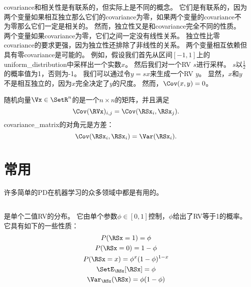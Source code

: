 \gls{covariance}和相关性是有联系的，但实际上是不同的概念。
它们是有联系的，因为两个变量如果相互独立那么它们的\gls{covariance}为零，如果两个变量的\gls{covariance}不为零那么它们一定是相关的。
然而，独立性又是和\gls{covariance}完全不同的性质。
两个变量如果\gls{covariance}为零，它们之间一定没有线性关系。
独立性比零\gls{covariance}的要求更强，因为独立性还排除了非线性的关系。
两个变量相互依赖但具有零\gls{covariance}是可能的。
例如，假设我们首先从区间$[-1, 1]$上的\gls{uniform_distribution}中采样出一个实数$x$。
然后我们对一个\gls{RV} $s$进行采样。
$s$以$\frac{1}{2}$的概率值为1，否则为-1。
我们可以通过令$y=sx$来生成一个\gls{RV} $y$。
显然，$x$和$y$不是相互独立的，因为$x$完全决定了$y$的尺度。
然而，$\Cov(x,y)=0$。


随机向量$\Vx \in \SetR^n$的是一个$n\times n$的矩阵，并且满足
\begin{equation}
\Cov(\RVx)_{i,j} = \Cov(\RSx_i, \RSx_j).
\end{equation}
\gls{covariance_matrix}的对角元是方差：
\begin{equation}
\Cov(\RSx_i, \RSx_i) = \Var(\RSx_i).
\end{equation}

\section{常用}
\label{sec:common_probability_distributions}

许多简单的\gls{PD}在机器学习的众多领域中都是有用的。

\subsection{}
\label{sec:bernoulli_distribution}

是单个二值\gls{RV}的分布。
它由单个参数$\phi \in [0, 1]$控制，$\phi$给出了\gls{RV}等于1的概率。
它具有如下的一些性质：
\begin{gather}
P(\RSx =1) = \phi\\
P(\RSx =0) = 1-\phi\\
P(\RSx = x) = \phi^x (1-\phi)^{1-x}\\
\SetE_{\RSx}[\RSx] = \phi\\
\Var_{\RSx}(\RSx) = \phi(1-\phi)
\end{gather}

\subsection{}
\label{sec:multinoulli_distribution}

